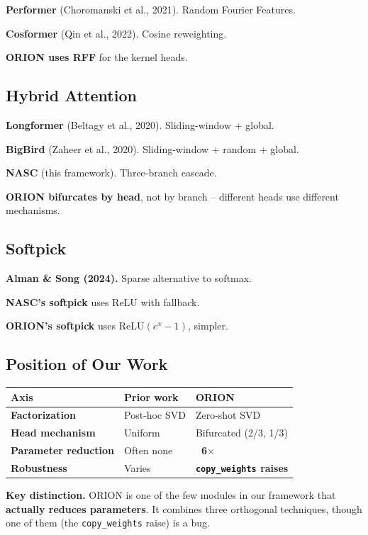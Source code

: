 \textbf{Performer} (Choromanski et al., 2021). Random Fourier Features.

\textbf{Cosformer} (Qin et al., 2022). Cosine reweighting.

\textbf{ORION uses RFF} for the kernel heads.

\subsection{Hybrid Attention}

\textbf{Longformer} (Beltagy et al., 2020). Sliding-window + global.

\textbf{BigBird} (Zaheer et al., 2020). Sliding-window + random + global.

\textbf{NASC} (this framework). Three-branch cascade.

\textbf{ORION bifurcates by head}, not by branch -- different heads use different 
mechanisms.

\subsection{Softpick}

\textbf{Alman \& Song (2024).} Sparse alternative to softmax.

\textbf{NASC's softpick} uses ReLU with fallback.

\textbf{ORION's softpick} uses $\text{ReLU}(e^x - 1)$, simpler.

\subsection{Position of Our Work}

\begin{table}[H]
\centering
\small
\begin{tabular}{lll}
\toprule
\textbf{Axis} & \textbf{Prior work} & \textbf{ORION} \\
\midrule
\textbf{Factorization} & Post-hoc SVD & Zero-shot SVD \\
\textbf{Head mechanism} & Uniform & Bifurcated (2/3, 1/3) \\
\textbf{Parameter reduction} & Often none & \textbf{~6$\times$} \\
\textbf{Robustness} & Varies & \textbf{\texttt{copy\_weights} raises} \\
\bottomrule
\end{tabular}
\end{table}

\textbf{Key distinction.} ORION is one of the few modules in our framework 
that \textbf{actually reduces parameters}. It combines three orthogonal 
techniques, though one of them (the \texttt{copy\_weights} raise) is a bug.



